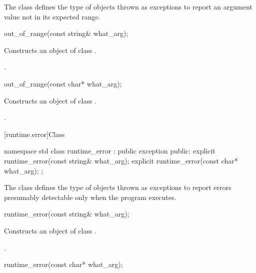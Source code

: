 \pnum
The class
defines the type of objects thrown as exceptions to report an
argument value not in its expected range.

%
\begin{itemdecl}
out_of_range(const string& what_arg);
\end{itemdecl}

\begin{itemdescr}
\pnum
\effects
Constructs an object of class
.

\pnum
\postconditions
{}.
\end{itemdescr}

%
\begin{itemdecl}
out_of_range(const char* what_arg);
\end{itemdecl}

\begin{itemdescr}
\pnum
\effects
Constructs an object of class
.

\pnum
\postconditions
{}.
\end{itemdescr}

[runtime.error]{Class }

%
\begin{codeblock}
namespace std {
  class runtime_error : public exception {
  public:
    explicit runtime_error(const string& what_arg);
    explicit runtime_error(const char* what_arg);
  };
}
\end{codeblock}

\pnum
The class
defines the type of objects thrown as exceptions to report errors presumably detectable only
when the program executes.

%
\begin{itemdecl}
runtime_error(const string& what_arg);
\end{itemdecl}

\begin{itemdescr}
\pnum
\effects
Constructs an object of class
.

\pnum
\postconditions
{}.
\end{itemdescr}

%
\begin{itemdecl}
runtime_error(const char* what_arg);
\end{itemdecl}

